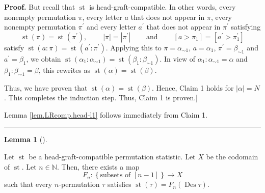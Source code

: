 \documentclass[numbers=enddot,12pt,final,onecolumn,notitlepage]{scrartcl}%
\theoremstyle{definition}
\newtheorem{lem}[theo]{Lemma}
\newenvironment{lemma}[1][]
{\begin{lem}[#1]\begin{leftbar}}
{\end{leftbar}\end{lem}}
\newenvironment{proof}[1][Proof]{\noindent\textbf{#1.} }{\ \rule{0.5em}{0.5em}}
\begin{document}
\begin{proof}
But recall that $\operatorname*{st}$ is head-graft-compatible. In other words,
every nonempty permutation $\pi$, every letter $a$ that does not appear in
$\pi$, every nonempty permutation $\pi^{\prime}$ and every letter $a^{\prime}$
that does not appear in $\pi^{\prime}$ satisfying%
\[
\operatorname*{st}\left(  \pi\right)  =\operatorname*{st}\left(  \pi^{\prime
}\right)  ,\ \ \ \ \ \ \ \ \ \ \left\vert \pi\right\vert =\left\vert
\pi^{\prime}\right\vert \ \ \ \ \ \ \ \ \ \ \text{and}%
\ \ \ \ \ \ \ \ \ \ \left[  a>\pi_{1}\right]  =\left[  a^{\prime}>\pi
_{1}^{\prime}\right]
\]
satisfy $\operatorname*{st}\left(  a:\pi\right)  =\operatorname*{st}\left(
a^{\prime}:\pi^{\prime}\right)  $. Applying this to $\pi=\alpha_{\sim1}$,
$a=\alpha_{1}$, $\pi^{\prime}=\beta_{\sim1}$ and $a^{\prime}=\beta_{1}$, we
obtain $\operatorname*{st}\left(  \alpha_{1}:\alpha_{\sim1}\right)
=\operatorname*{st}\left(  \beta_{1}:\beta_{\sim1}\right)  $. In view of
$\alpha_{1}:\alpha_{\sim1}=\alpha$ and $\beta_{1}:\beta_{\sim1}=\beta$, this
rewrites as $\operatorname*{st}\left(  \alpha\right)  =\operatorname*{st}%
\left(  \beta\right)  $.

Thus, we have proven that $\operatorname*{st}\left(  \alpha\right)
=\operatorname*{st}\left(  \beta\right)  $. Hence, Claim 1 holds for
$\left\vert \alpha\right\vert =N$. This completes the induction step. Thus,
Claim 1 is proven.]

Lemma \ref{lem.LRcomp.head-l1} follows immediately from Claim 1.
\end{proof}

\begin{lemma}
\label{lem.LRcomp.head-l2}Let $\operatorname*{st}$ be a head-graft-compatible
permutation statistic. Let $X$ be the codomain of $\operatorname*{st}$. Let
$n\in\mathbb{N}$. Then, there exists a map
\[
F_{n}:\left\{  \text{subsets of }\left[  n-1\right]  \right\}  \rightarrow X
\]
such that every $n$-permutation $\tau$ satisfies $\operatorname*{st}\left(
\tau\right)  =F_{n}\left(  \operatorname*{Des}\tau\right)  $.
\end{lemma}
\end{document}
